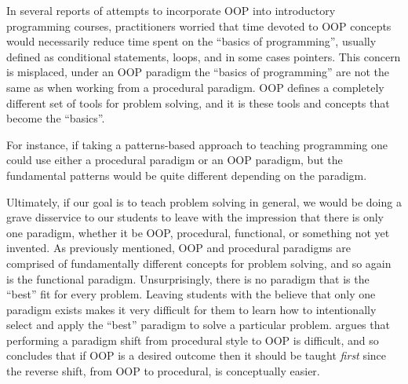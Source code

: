 \documentclass[12pt]{article}
\begin{document}

In several reports of attempts to incorporate OOP into introductory
programming courses, practitioners worried that time devoted to OOP
concepts would necessarily reduce time spent on the ``basics of
programming'', usually defined as conditional statements, loops, and
in some cases pointers. This concern is misplaced, under an OOP
paradigm the ``basics of programming'' are not the same as when
working from a procedural paradigm. OOP defines a completely different
set of tools for problem solving, and it is these tools and concepts
that become the
``basics''\autocite{kolling_problem_1999,kay_history_1996}.

For instance, if taking a patterns-based approach to teaching
programming one could use either a procedural paradigm or an OOP
paradigm, but the fundamental patterns would be quite different
depending on the paradigm\autocite{wallingford_first_1996}.

Ultimately, if our goal is to teach problem solving in general, we
would be doing a grave disservice to our students to leave with the
impression that there is only one paradigm, whether it be OOP,
procedural, functional, or something not yet invented. As previously
mentioned, OOP and procedural paradigms are comprised of fundamentally
different concepts for problem solving, and so again is the functional
paradigm. Unsurprisingly, there is no paradigm that is the ``best''
fit for every problem. Leaving students with the believe that only one
paradigm exists makes it very difficult for them to learn how to
intentionally select and apply the ``best'' paradigm to solve a
particular problem. \citeauthor{kolling_problem_1999} argues that
performing a paradigm shift from procedural style to OOP is difficult,
and so concludes that if OOP is a desired outcome then it should be
taught \emph{first} since the reverse shift, from OOP to procedural,
is conceptually easier.
\end{document}
